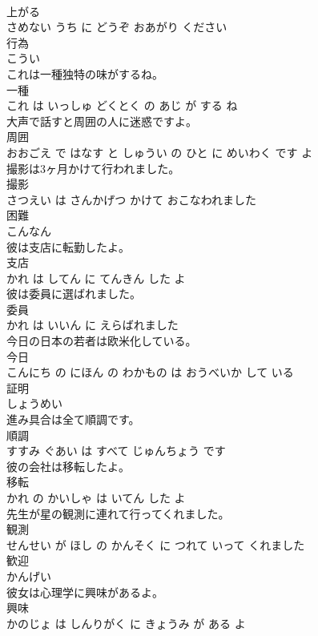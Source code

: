 \documentclass[8pt]{extreport}
\begin{document}
\begin{CJK}{UTF8}{min}
\\	上がる 
\\	さめない うち に どうぞ おあがり ください		
\\	行為	
\\	こうい		
\\	これは一種独特の味がするね。	
\\	一種 
\\	これ は いっしゅ どくとく の あじ が する ね		
\\	大声で話すと周囲の人に迷惑ですよ。	
\\	周囲 
\\	おおごえ で はなす と しゅうい の ひと に めいわく です よ		
\\	撮影は3ヶ月かけて行われました。	
\\	撮影 
\\	さつえい は さんかげつ かけて おこなわれました		
\\	困難	
\\	こんなん		
\\	彼は支店に転勤したよ。	
\\	支店 
\\	かれ は してん に てんきん した よ		
\\	彼は委員に選ばれました。	
\\	委員 
\\	かれ は いいん に えらばれました		
\\	今日の日本の若者は欧米化している。	
\\	今日 
\\	こんにち の にほん の わかもの は おうべいか して いる		
\\	証明	
\\	しょうめい		
\\	進み具合は全て順調です。	
\\	順調 
\\	すすみ ぐあい は すべて じゅんちょう です		
\\	彼の会社は移転したよ。	
\\	移転 
\\	かれ の かいしゃ は いてん した よ		
\\	先生が星の観測に連れて行ってくれました。	
\\	観測 
\\	せんせい が ほし の かんそく に つれて いって くれました		
\\	歓迎	
\\	かんげい		
\\	彼女は心理学に興味があるよ。	
\\	興味 
\\	かのじょ は しんりがく に きょうみ が ある よ		

\end{CJK}
\end{document}
